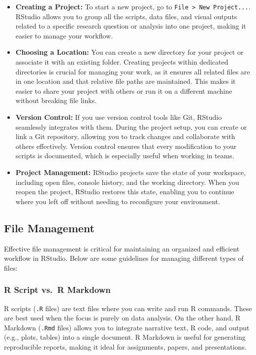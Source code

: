 \documentclass[
]{book}
\begin{document}
\begin{itemize}
\item
  \textbf{Creating a Project:} To start a new project, go to \texttt{File\ \textgreater{}\ New\ Project...}. RStudio allows you to group all the scripts, data files, and visual outputs related to a specific research question or analysis into one project, making it easier to manage your workflow.
\item
  \textbf{Choosing a Location:} You can create a new directory for your project or associate it with an existing folder. Creating projects within dedicated directories is crucial for managing your work, as it ensures all related files are in one location and that relative file paths are maintained. This makes it easier to share your project with others or run it on a different machine without breaking file links.
\item
  \textbf{Version Control:} If you use version control tools like Git, RStudio seamlessly integrates with them. During the project setup, you can create or link a Git repository, allowing you to track changes and collaborate with others effectively. Version control ensures that every modification to your scripts is documented, which is especially useful when working in teams.
\item
  \textbf{Project Management:} RStudio projects save the state of your workspace, including open files, console history, and the working directory. When you reopen the project, RStudio restores this state, enabling you to continue where you left off without needing to reconfigure your environment.
\end{itemize}

\subsection*{File Management}\label{file-management}

Effective file management is critical for maintaining an organized and efficient workflow in RStudio. Below are some guidelines for managing different types of files:

\subsubsection*{R Script vs.~R Markdown}\label{r-script-vs.-r-markdown}

R scripts (\texttt{.R} files) are text files where you can write and run R commands. These are best used when the focus is purely on data analysis. On the other hand, R Markdown (\texttt{.Rmd} files) allows you to integrate narrative text, R code, and output (e.g., plots, tables) into a single document. R Markdown is useful for generating reproducible reports, making it ideal for assignments, papers, and presentations.
\end{document}
